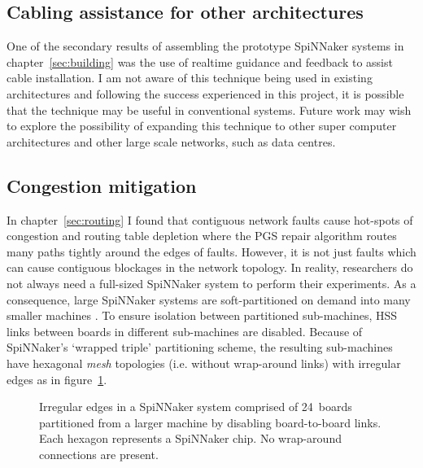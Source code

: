 		\subsection{Cabling assistance for other architectures}
			
			One of the secondary results of assembling the prototype SpiNNaker
			systems in chapter~\ref{sec:building} was the use of realtime guidance
			and feedback to assist cable installation. I am not aware of this
			technique being used in existing architectures and following the success
			experienced in this project, it is possible that the technique may be
			useful in conventional systems. Future work may wish to explore the
			possibility of expanding this technique to other super computer
			architectures and other large scale networks, such as data centres.
		
		\subsection{Congestion mitigation}
			
			\label{sec:wiggly-board-allocations}
			
			In chapter~\ref{sec:routing} I found that contiguous network faults cause
			hot-spots of congestion and routing table depletion where the PGS repair
			algorithm routes many paths tightly around the edges of faults.  However,
			it is not just faults which can cause contiguous blockages in the network
			topology. In reality, researchers do not always need a full-sized
			SpiNNaker system to perform their experiments. As a consequence, large
			SpiNNaker systems are soft-partitioned on demand into many smaller
			machines \cite{spalloc16}. To ensure isolation between partitioned
			sub-machines, HSS links between boards in different sub-machines are
			disabled. Because of SpiNNaker's `wrapped triple' partitioning scheme,
			the resulting sub-machines have hexagonal \emph{mesh} topologies (i.e.
			without wrap-around links) with irregular edges as in
			figure~\ref{fig:spalloc-mesh}.
			
			\begin{figure}
				\center
				
				\caption{Irregular edges in a SpiNNaker system comprised of 24~boards
				partitioned from a larger machine by disabling board-to-board links.
				Each hexagon represents a SpiNNaker chip. No wrap-around connections
				are present.}
				\label{fig:spalloc-mesh}
			\end{figure}
			
